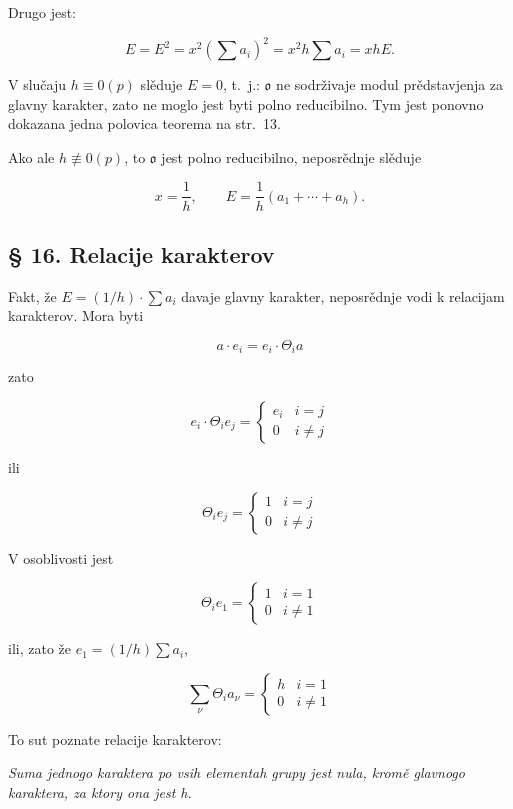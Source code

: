 \documentclass[11pt]{article}
\begin{document}
Drugo jest:

\[
E=E^2=x^2\left(\sum a_i\right)^2=x^2h\sum a_i=xhE.
\]

V slučaju \(h\equiv0(p)\) slěduje \(E=0\), t.~j.: \(\mathfrak o\) ne sodrživaje modul prědstavjenja za glavny karakter, zato ne moglo jest byti polno reducibilno. Tym jest ponovno dokazana jedna polovica teorema na str.~13.

Ako ale \(h\not\equiv0(p)\), to \(\mathfrak o\) jest polno reducibilno, neposrědnje slěduje

\[
x=\frac{1}{h},\qquad E=\frac{1}{h}(a_1+\cdots+a_h).
\]

\subsection*{§ 16. Relacije karakterov}\label{die-charakterenrelationen}

Fakt, že \(E=(1/h)\cdot\sum a_i\) davaje glavny karakter, neposrědnje vodi k relacijam karakterov. Mora byti

\[a \cdot e_i = e_i \cdot \Theta_i a\]

zato

\[e_i \cdot \Theta_i e_j = \begin{cases} e_i & i = j \\ 0 & i \neq j \end{cases}\]

ili

\[\Theta_i e_j = \begin{cases} 1 & i = j \\ 0 & i \neq j \end{cases}\]

V osoblivosti jest

\[\Theta_i e_1 = \begin{cases} 1 & i = 1 \\ 0 & i \neq 1 \end{cases}\]

ili, zato že \(e_1 = (1/h) \sum a_i\),

\[
\sum_\nu \Theta_i a_\nu=\begin{cases} h & i=1\\ 0 & i\ne 1 \end{cases}
\]

To sut poznate relacije karakterov:

\emph{Suma jednogo karaktera po vsih elementah grupy jest nula, kromě glavnogo karaktera, za ktory ona jest h.}
\end{document}
